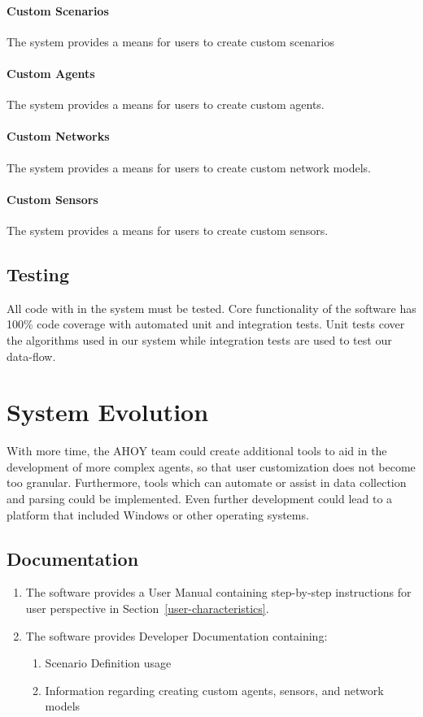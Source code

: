 \documentclass[titlepage]{article}
\begin{document}
    \paragraph{Custom Scenarios} The system provides a means for users to create custom scenarios
    \paragraph{Custom Agents} The system provides a means for users to create custom agents.
    \paragraph{Custom Networks} The system provides a means for users to create custom network models.
    \paragraph{Custom Sensors} The system provides a means for users to create custom sensors.

\subsection{Testing%
    \label{testing}%
}
All code with in the system must be tested. Core functionality of the software has 100\% code coverage with automated unit and integration tests.  Unit tests cover the algorithms used in our system while integration tests are used to test our data-flow.  

\section{System Evolution}

With more time, the AHOY team could create additional tools to aid in the development of more complex agents, so that user customization does not become too granular.  Furthermore, tools which can automate or assist in data collection and parsing could be implemented.  Even further development could lead to a platform that included Windows or other operating systems.


\subsection{Documentation%
  \label{documentation}%
}
\begin{enumerate}
    \item The software provides a User Manual containing step-by-step instructions for user perspective in Section~\ref{user-characteristics}.
    \item The software provides Developer Documentation containing:
    \begin{enumerate}
        \item Scenario Definition usage
        \item Information regarding creating custom agents, sensors, and network models
    \end{enumerate}
\end{enumerate}


\appendix
\pagebreak
\end{document}
